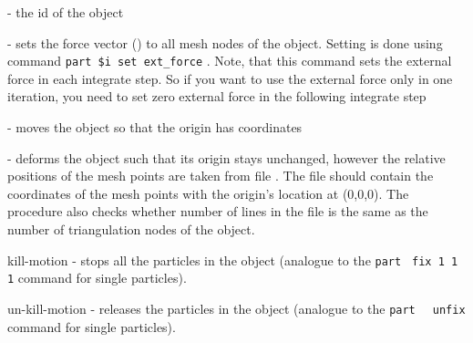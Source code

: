 \begin{arguments}
\item[\var{oid}] - the id of the object
\item[\opt{force \var{x} \var{y} \var{z}}] - sets the force vector () to all mesh nodes of the object. Setting is done using \es command \verb|part $i set ext_force|   . Note, that this command sets the external force in each integrate step. So if you want to use the external force only in one iteration, you need to set zero external force in the following integrate step
\item[\opt{origin \var{x} \var{y} \var{z}}] - moves the object so that the origin has coordinates 
\item[\opt{mesh-nodes \var{mesh\_nodes.dat}}] - deforms the object such that its origin stays unchanged, however the relative positions of the mesh points are taken from file . The file  should contain the coordinates of the mesh points with the origin's location at (0,0,0). The procedure also checks whether number of lines in the  file is the same as the number of triangulation nodes of the object.
\item[kill-motion] - stops all the particles in the object (analogue to the \verb|part |  \verb|fix 1 1 1| command for single particles).
\item[un-kill-motion] - releases the particles in the object (analogue to the \verb|part |  \verb| unfix| command for single particles).
\end{arguments} 


